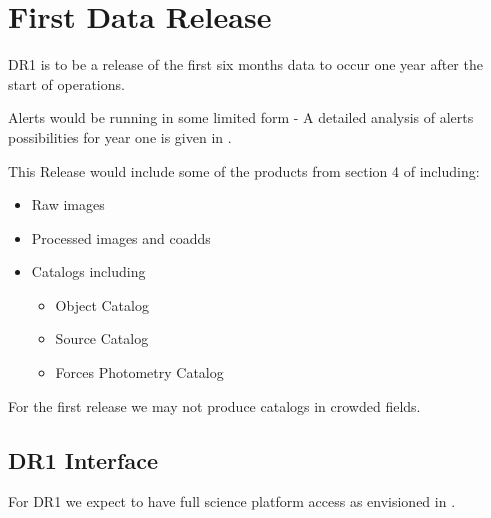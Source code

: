 \section{First Data Release } \label{sect:dr1}

DR1 is to be a release of the first six months data to occur one year after the start of operations.

Alerts would be running in some limited form - A detailed analysis of alerts possibilities for year one is given in .


This Release would include some of the products from section 4 of \DPDD including:

\begin{itemize}
\item  Raw images
\item  Processed images and coadds
\item  Catalogs including

\begin{itemize}
\item Object Catalog
\item Source Catalog
\item Forces Photometry Catalog
\end{itemize}

\end{itemize}

For the first release we may not produce catalogs in crowded fields.

\subsection {DR1 Interface}
For DR1 we expect to have full science platform access as envisioned in .

